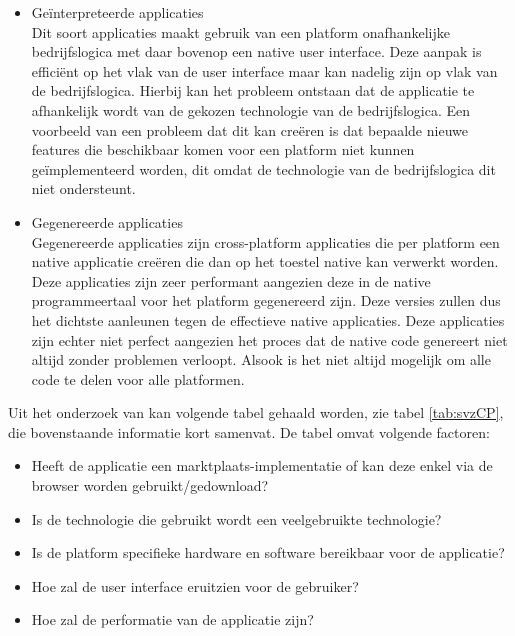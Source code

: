 \begin{itemize}
    \item Geïnterpreteerde applicaties\\
    Dit soort applicaties maakt gebruik van een platform onafhankelijke bedrijfslogica met daar bovenop een native user interface. Deze aanpak is efficiënt op het vlak van de user interface maar kan nadelig zijn op vlak van de bedrijfslogica. Hierbij kan het probleem ontstaan dat de applicatie te afhankelijk wordt van de gekozen technologie van de bedrijfslogica. Een voorbeeld van een probleem dat dit kan creëren is dat bepaalde nieuwe features die beschikbaar komen voor een platform niet kunnen geïmplementeerd worden, dit omdat de technologie van de bedrijfslogica dit niet ondersteunt.
    \\
    
    \item Gegenereerde applicaties\\
    Gegenereerde applicaties zijn cross-platform applicaties die per platform een native applicatie creëren die dan op het toestel native kan verwerkt worden. Deze applicaties zijn zeer performant aangezien deze in de native programmeertaal voor het platform gegenereerd zijn. Deze versies zullen dus het dichtste aanleunen tegen de effectieve native applicaties. Deze applicaties zijn echter niet perfect aangezien het proces dat de native code genereert niet altijd zonder problemen verloopt. Alsook is het niet altijd mogelijk om alle code te delen voor alle platformen.
\end{itemize}

Uit het onderzoek van \textcite{Xanthopoulos2013} kan volgende tabel gehaald worden, zie tabel  \ref{tab:svzCP},  die bovenstaande informatie kort samenvat. De tabel omvat volgende factoren:
\begin{itemize}
    \item Heeft de applicatie een marktplaats-implementatie of kan deze enkel via de browser worden gebruikt/gedownload?
    \item Is de technologie die gebruikt wordt een veelgebruikte technologie?
    \item Is de platform specifieke hardware en software bereikbaar voor de applicatie?
    \item Hoe zal de user interface eruitzien voor de gebruiker?
    \item Hoe zal de performatie van de applicatie zijn?
\end{itemize}

